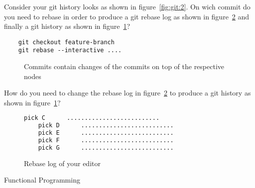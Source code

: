 \documentclass[addpoints]{exam}
\begin{document}
\begin{questions}
\begin{parts}
\begin{subparts}
\subpart[1]
  Consider your git history looks as shown in figure~\ref{fig:git:2}.
  On wich commit do you need to rebase in order to produce a git rebase log as
  shown in figure~\ref{fig:rebase-log} and finally a git history as shown
  in figure~\ref{fig:git:3}?
  \begin{lstlisting}
    git checkout feature-branch
    git rebase --interactive ....
  \end{lstlisting}

\begin{figure}[h]
  \centering
  
  \caption{Commits contain changes of the commits on top of the respective nodes}
  \label{fig:git:3}
\end{figure}


  \subpart[2] How do you need to change the rebase log in
  figure~\ref{fig:rebase-log} to produce a git history as shown in
  figure~\ref{fig:git:3}?

  \begin{figure}[h]
    \begin{lstlisting}[language=bash]
    pick C      ..........................
    pick D      ..........................
    pick E      ..........................
    pick F      ..........................
    pick G      ..........................
    \end{lstlisting}
    \caption{Rebase log of your editor}
    \label{fig:rebase-log}
  \end{figure}

\end{subparts}

\end{parts}


\clearpage

\question Functional Programming

\end{questions}
\end{document}
